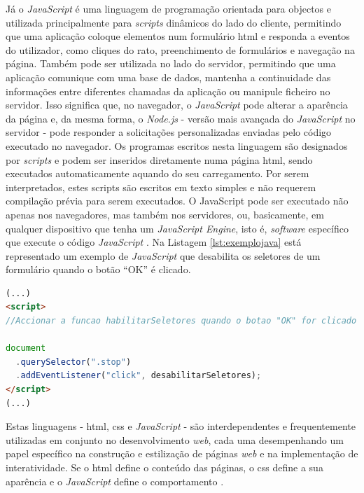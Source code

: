 Já o \textit{JavaScript} é uma linguagem de programação orientada para objectos e utilizada principalmente para \textit{scripts} dinâmicos do lado do cliente, permitindo que uma aplicação coloque elementos num formulário \acrshort{html} e responda a eventos do utilizador, como cliques do rato, preenchimento de formulários e navegação na página. Também pode ser utilizada no lado do servidor, permitindo que uma aplicação comunique com uma base de dados, mantenha a continuidade das informações entre diferentes chamadas da aplicação ou manipule ficheiro no servidor. Isso significa que, no navegador, o \textit{JavaScript} pode alterar a aparência da página e, da mesma forma, o \textit{Node.js} - versão mais avançada do \textit{JavaScript} no servidor - pode responder a solicitações personalizadas enviadas pelo código executado no navegador.  Os programas escritos nesta linguagem são designados por \textit{scripts} e podem ser inseridos diretamente numa página \acrshort{html}, sendo executados automaticamente aquando do seu carregamento. Por serem interpretados, estes scripts são escritos em texto simples e não requerem compilação prévia para serem executados. O JavaScript pode ser executado não apenas nos navegadores, mas também nos servidores, ou, basicamente, em qualquer dispositivo que tenha um \textit{JavaScript Engine}, isto é, \textit{software} específico que execute o código \textit{JavaScript} \cite{JavaScriptRef}. Na Listagem \ref{lst:exemplojava} está representado um exemplo de \textit{JavaScript} que desabilita os seletores de um formulário quando o botão ``OK'' é clicado.

\begin{minipage}{0.9\linewidth}
    \begin{lstlisting}[language=HTML, caption=Exemplo de \textit{JavaScript}, label=lst:exemplojava]
(...)
<script>
//Accionar a funcao habilitarSeletores quando o botao "OK" for clicado

document
  .querySelector(".stop")
  .addEventListener("click", desabilitarSeletores);
</script>
(...)
	\end{lstlisting}
\end{minipage}

Estas linguagens - \acrshort{html}, \acrshort{css} e \textit{JavaScript} - são interdependentes e frequentemente utilizadas em conjunto no desenvolvimento \textit{web}, cada uma desempenhando um papel específico na construção e estilização de páginas \textit{web} e na implementação de interatividade. Se o \acrshort{html} define o conteúdo das páginas, o \acrshort{css} define a sua aparência e o \textit{JavaScript} define o comportamento \cite{JavaScript}.


